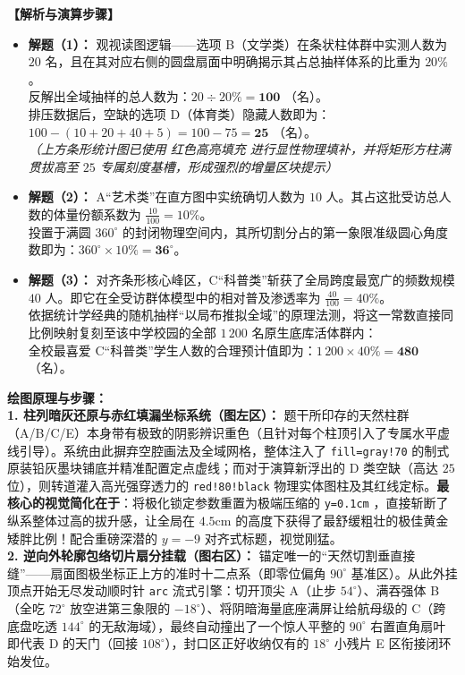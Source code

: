 \vspace{0.4cm}
\textbf{【解析与演算步骤】}
\begin{itemize}
    \item \textbf{解题（1）：} 观视读图逻辑——选项 B（文学类）在条状柱体群中实测人数为 $20$ 名，且在其对应右侧的圆盘扇面中明确揭示其占总抽样体系的比重为 $20\%$。\\
    反解出全域抽样的总人数为：$20 \div 20\% = \mathbf{100}$ （名）。\\
    排压数据后，空缺的选项 D（体育类）隐藏人数即为：$100 - (10 + 20 + 40 + 5) = 100 - 75 = \mathbf{25}$ （名）。\\
    \textit{（上方条形统计图已使用 \textcolor{red!80!black}{红色高亮填充} 进行显性物理填补，并将矩形方柱满贯拔高至 $25$ 专属刻度基槽，形成强烈的增量区块提示）}
    \item \textbf{解题（2）：} A“艺术类”在直方图中实统确切人数为 $10$ 人。其占这批受访总人数的体量份额系数为 $\frac{10}{100} = 10\%$。\\
    投置于满圆 $360^\circ$ 的封闭物理空间内，其所切割分占的第一象限准级圆心角度数即为：$360^\circ \times 10\% = \mathbf{36^\circ}$。
    \item \textbf{解题（3）：} 对齐条形核心峰区，C“科普类”斩获了全局跨度最宽广的频数规模 $40$ 人。即它在全受访群体模型中的相对普及渗透率为 $\frac{40}{100} = 40\%$。\\
    依据统计学经典的随机抽样“以局布推拟全域”的原理法测，将这一常数直接同比例映射复刻至该中学校园的全部 $1\,200$ 名原生底库活体群内：\\
    全校最喜爱 C“科普类”学生人数的合理预计值即为：$1\,200 \times 40\% = \mathbf{480}$ （名）。
\end{itemize}

\vspace{0.4cm}
{\small\color{blue!70!black}
\textbf{绘图原理与步骤：}\\
\textbf{1. 柱列暗灰还原与赤红填漏坐标系统（图左区）：} 题干所印存的天然柱群（A/B/C/E）本身带有极致的阴影辨识重色（且针对每个柱顶引入了专属水平虚线引导）。系统由此摒弃空腔画法及全域网格，整体注入了 \texttt{fill=gray!70} 的制式原装铅灰墨块铺底并精准配置定点虚线；而对于演算新浮出的 D 类空缺（高达 $25$ 位），则转道灌入高光强穿透力的 \texttt{red!80!black} 物理实体图柱及其红线定标。\textbf{最核心的视觉简化在于}：将极化锁定参数重置为极端压缩的 \texttt{y=0.1cm} ，直接斩断了纵系整体过高的拔升感，让全局在 $4.5\mathrm{cm}$ 的高度下获得了最舒缓粗壮的极佳黄金矮胖比例！配合重磅深潜的 $y=-9$ 对齐式标题，视觉刚猛。\\
\textbf{2. 逆向外轮廓包络切片扇分挂载（图右区）：} 锚定唯一的“天然切割垂直接缝”——扇面图极坐标正上方的准时十二点系（即零位偏角 $90^\circ$ 基准区）。从此外挂顶点开始无尽发动顺时针 \texttt{arc} 流式引擎：切开顶尖 A（止步 $54^\circ$）、满吞强体 B（全吃 $72^\circ$ 放空进第三象限的 $-18^\circ$）、将阴暗海量底座满屏让给航母级的 C（跨底盘吃透 $144^\circ$ 的无敌海域），最终自动撞出了一个惊人平整的 $90^\circ$ 右置直角扇叶即代表 D 的天门（回接 $108^\circ$），封口区正好收纳仅有的 $18^\circ$ 小残片 E 区衔接闭环始发位。
}

